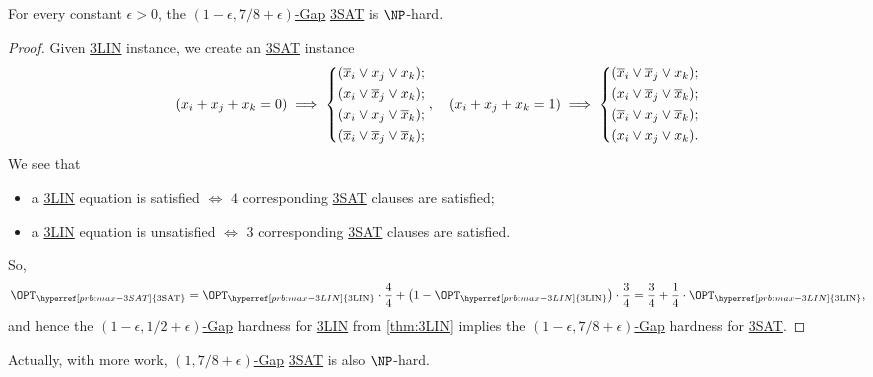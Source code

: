\begin{corollary}
	For every constant \(\epsilon > 0\), the \hyperref[def:c-s-Gap]{\((1-\epsilon , 7 / 8 + \epsilon )\)-Gap} \hyperref[prb:max-3SAT]{3SAT} is \(\NP\)-hard.
\end{corollary}
\begin{proof}
	Given \hyperref[prb:max-3LIN]{3LIN} instance, we create an \hyperref[prb:max-3SAT]{3SAT} instance
	\[
		(x_i + x_j + x_k = 0) \implies \begin{dcases}
			(\overline{x} _i \lor x_j \lor x_k);   \\
			(x _i \lor \overline{x} _j \lor x_k);  \\
			(x _i \lor x _j \lor \overline{x} _k); \\
			(\overline{x} _i \lor \overline{x} _j \lor \overline{x} _k);
		\end{dcases},\quad
		(x_i + x_j + x_k = 1) \implies \begin{dcases}
			(\overline{x} _i \lor \overline{x} _j \lor x_k);   \\
			(x _i \lor \overline{x} _j \lor \overline{x} _k);  \\
			(\overline{x}  _i \lor x _j \lor \overline{x} _k); \\
			(x_i \lor x _j \lor x _k).
		\end{dcases}
	\]
	We see that
	\begin{itemize}
		\item a \hyperref[prb:max-3LIN]{3LIN} equation is satisfied \(\iff \) \(4\) corresponding \hyperref[prb:max-3SAT]{3SAT} clauses are satisfied;
		\item a \hyperref[prb:max-3LIN]{3LIN} equation is unsatisfied \(\iff \) \(3\) corresponding \hyperref[prb:max-3SAT]{3SAT} clauses are satisfied.
	\end{itemize}
	So,
	\[
		\OPT_{\hyperref[prb:max-3SAT]{\text{3SAT}}}
		= \OPT_{\hyperref[prb:max-3LIN]{\text{3LIN}}} \cdot \frac{4}{4} + \left( 1 - \OPT_{\hyperref[prb:max-3LIN]{\text{3LIN}}} \right) \cdot \frac{3}{4}
		= \frac{3}{4} + \frac{1}{4}\cdot \OPT_{\hyperref[prb:max-3LIN]{\text{3LIN}}},
	\]
	and hence the \hyperref[def:c-s-Gap]{\((1 - \epsilon , 1 / 2 + \epsilon )\)-Gap} hardness for \hyperref[prb:max-3LIN]{3LIN} from \autoref{thm:3LIN} implies the \hyperref[def:c-s-Gap]{\((1-\epsilon , 7 / 8 + \epsilon )\)-Gap} hardness for \hyperref[prb:max-3SAT]{3SAT}.
\end{proof}

\begin{remark}
	Actually, with more work, \hyperref[def:c-s-Gap]{\((1 , 7 / 8 + \epsilon )\)-Gap} \hyperref[prb:max-3SAT]{3SAT} is also \(\NP\)-hard.
\end{remark}

